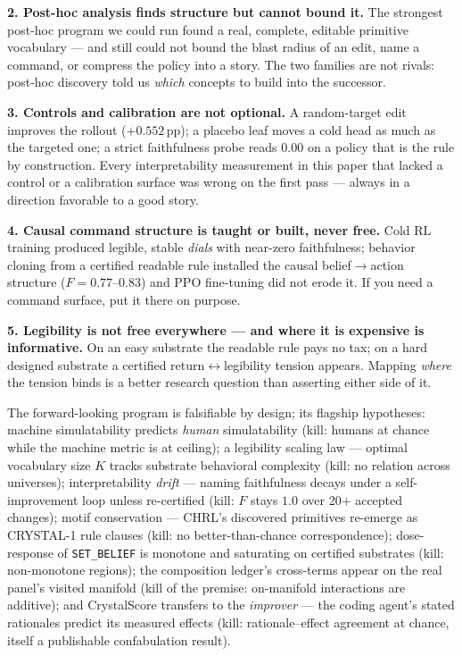 \documentclass[11pt]{article}
\begin{document}
\textbf{2. Post-hoc analysis finds structure but cannot bound it.} The strongest post-hoc
program we could run found a real, complete, editable primitive vocabulary --- and still could
not bound the blast radius of an edit, name a command, or compress the policy into a story.
The two families are not rivals: post-hoc discovery told us \emph{which} concepts to build into
the successor.

\textbf{3. Controls and calibration are not optional.} A random-target edit improves the
rollout ($+0.552$\,pp); a placebo leaf moves a cold head as much as the targeted one; a strict
faithfulness probe reads $0.00$ on a policy that is the rule by construction. Every
interpretability measurement in this paper that lacked a control or a calibration surface was
wrong on the first pass --- always in a direction favorable to a good story.

\textbf{4. Causal command structure is taught or built, never free.} Cold RL training produced
legible, stable \emph{dials} with near-zero faithfulness; behavior cloning from a certified
readable rule installed the causal belief$\to$action structure ($F = 0.77$--$0.83$) and PPO
fine-tuning did not erode it. If you need a command surface, put it there on purpose.

\textbf{5. Legibility is not free everywhere --- and where it is expensive is informative.} On
an easy substrate the readable rule pays no tax; on a hard designed substrate a certified
return$\leftrightarrow$legibility tension appears. Mapping \emph{where} the tension binds is a
better research question than asserting either side of it.

The forward-looking program is falsifiable by design; its flagship hypotheses: machine
simulatability predicts \emph{human} simulatability (kill: humans at chance while the machine
metric is at ceiling); a legibility scaling law --- optimal vocabulary size $K$ tracks substrate
behavioral complexity (kill: no relation across universes); interpretability \emph{drift} ---
naming faithfulness decays under a self-improvement loop unless re-certified (kill: $F$ stays
$1.0$ over 20+ accepted changes); motif conservation --- CHRL's discovered primitives re-emerge
as CRYSTAL-1 rule clauses (kill: no better-than-chance correspondence); dose-response of
\texttt{SET\_BELIEF} is monotone and saturating on certified substrates (kill: non-monotone
regions); the composition ledger's cross-terms appear on the real panel's visited manifold
(kill of the premise: on-manifold interactions are additive); and CrystalScore transfers to the
\emph{improver} --- the coding agent's stated rationales predict its measured effects (kill:
rationale--effect agreement at chance, itself a publishable confabulation result).
\end{document}
